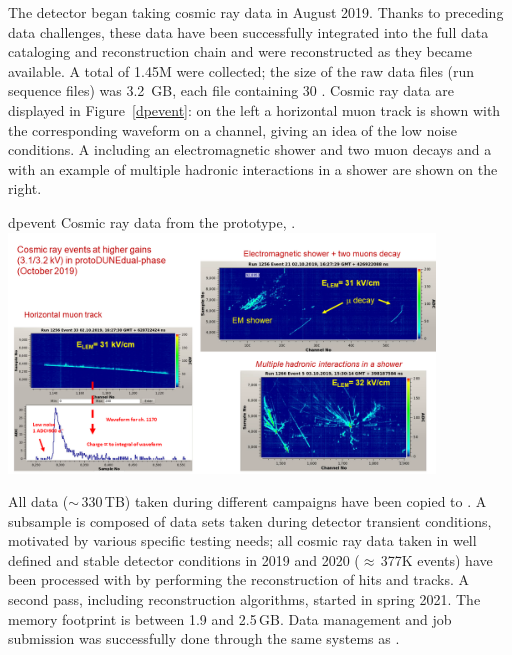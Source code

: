 \documentclass[../main-v1.tex]{subfiles}
\begin{document}
The  detector began taking cosmic ray data in August 2019. Thanks to preceding data challenges, these data have been successfully integrated into the full data cataloging and reconstruction chain and were   reconstructed as they became available.
A total of 1.45M  were collected; the size of the raw data files (run sequence files) was 3.2 \,GB, each file containing 30 . Cosmic ray data are displayed in Figure~\ref{dpevent}: on
the left a horizontal muon track is shown with the corresponding waveform on a channel, giving an
idea of the low noise conditions. A  including an electromagnetic shower and two muon decays
and a  with an example of multiple hadronic interactions in a shower are shown on the right.


 
\begin{dunefigure}
{dpevent} %
{Cosmic ray data from the  prototype, .}
\includegraphics[width=0.85\textwidth]{graphics/IntroFigures/Fig_09_protodune-dp-event.png}
\end{dunefigure}


All data ($\sim$\,330\,TB) taken during different campaigns   have been copied to . A subsample is composed of data sets taken during detector transient conditions, motivated by various specific testing needs;  all cosmic ray data taken in well defined and stable detector conditions in 2019 and 2020 ($\approx$\,377K events) have been processed with  by performing the reconstruction of hits and \twod tracks. A second pass, including  reconstruction algorithms, started in spring 2021. 
The memory footprint is between 1.9 and 2.5\,GB.
Data management and job submission was successfully done through the same systems as .
\end{document}

